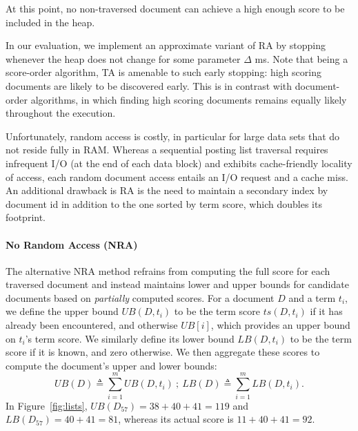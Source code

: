 At this point, no non-traversed document can achieve a high enough score to be included in the heap. 

In our evaluation, we implement an approximate variant of RA by stopping whenever the heap does not change for some parameter $\Delta$ ms. 
Note that being a score-order algorithm,  TA is amenable to such early stopping: high scoring documents are likely to be discovered early.
This is in contrast with document-order algorithms, in which finding high scoring documents remains equally likely throughout the execution.

Unfortunately, random access is costly,  in particular for large data sets that do not reside fully in RAM.
Whereas a sequential posting list traversal requires infrequent I/O (at the end of each data block) and exhibits cache-friendly locality of access,  each random document access entails an I/O request and a cache miss.  
An additional drawback is RA is the need to maintain a secondary index by document id in addition to the one sorted by term score, which doubles its footprint. 

\paragraph{No Random Access (NRA)} 
The alternative NRA method %
refrains from computing the full score for each traversed document and instead
maintains lower and upper bounds for candidate documents based on {\em partially\/} computed scores. 
For a document $D$ and a term $t_i$, we define the upper bound $UB(D, t_i)$ to be the term score $ts(D, t_i)$ if it has already been encountered, and otherwise $UB[i]$, which provides an upper bound on $t_i$'s term score. We similarly define its lower bound $LB(D, t_i)$ to be the term score if it is known, and zero otherwise. We then aggregate these scores to compute the document's upper and lower bounds:
\[
UB(D) \triangleq \sum_{i=1}^m UB(D, t_i) \ ; \  
LB(D) \triangleq \sum_{i=1}^m LB(D, t_i).
\] 
In Figure~\ref{fig:lists}, $UB(D_{57}) = 38+40+41 = 119$ and $LB(D_{57}) = 40+41 = 81$, whereas its actual score  is $11+ 40+41 = 92$.

